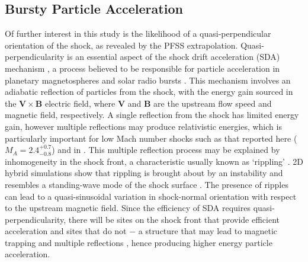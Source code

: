 \subsection{Bursty Particle Acceleration}

Of further interest in this study is the likelihood of a quasi-perpendicular orientation of the shock, as revealed by the PFSS extrapolation. 
Quasi-perpendicularity is an essential aspect of the shock drift acceleration (SDA) mechanism \citep{ball2001}, a process believed to be responsible for particle acceleration in planetary magnetospheres \citep{wu1984} and solar radio bursts \citep{holman1983}.
This mechanism involves an adiabatic reflection of particles from the shock, with the energy gain sourced in the $\mathbf{V} \times \mathbf{B}$ electric field, where $\mathbf{V}$ and $\mathbf{B}$ are the upstream flow speed and magnetic field, respectively. A single reflection from the shock has limited energy gain, however multiple reflections may produce relativistic energies, which is particularly important for low Mach number shocks such as that reported here ($M_A =2.4^{+0.7}_{-0.8}$) and in \citep{guo2012}. This multiple reflection process may be explained by inhomogeneity in the shock front, a characteristic usually known as \textquoteleft rippling' \citep{zlobec1993, vandas2011}. 2D hybrid simulations show that rippling is brought about by an instability \citep{burgess2006} and resembles a standing-wave mode of the shock surface \citep{lowe2003}. The presence of ripples can lead to a quasi-sinusoidal variation in shock-normal orientation with respect to the upstream magnetic field. Since the efficiency of SDA requires quasi-perpendicularity, there will be sites on the shock front that provide efficient acceleration and sites that do not $-$ a structure that may lead to magnetic trapping and multiple reflections \citep{zlobec1993}, hence producing higher energy particle acceleration. 

